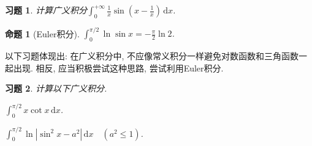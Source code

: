 \documentclass[11pt,a4paper]{ctexart}
\makeatletter
\theoremstyle{thmseries} %
\newtheorem{prop}{命题}[section]
\theoremstyle{exerseries}
\newtheorem{exer}{习题}[section]
\renewenvironment{proof}[1][\proofname]{\par
  \pushQED{\qed}%
  \normalfont \topsep6\p@\@plus6\p@\relax
  \trivlist
  \item[\hskip\labelsep
        \itshape
    #1\@addpunct{}]\ignorespaces
}{%
  \popQED\endtrivlist\@endpefalse
}
\newenvironment{sol}{\begin{proof}[\bfseries\upshape 解\quad]}{\end{proof}}
\newcommand{\bra}[1]{\mathopen{}\left(#1\right)}
\renewcommand{\d}{\mathrm{d}}
\makeatother
\begin{document}
\begin{exer}
	计算广义积分$\int_{0}^{+\infty}\frac{1}{x}\sin\bra{x-\frac{1}{x}}\,\d x$. 
\end{exer}

\begin{prop}[Euler积分]
	$\int_{0}^{\pi/2}\ln\sin x=-\frac{\pi}{2}\ln 2$. 
\end{prop}

以下习题体现出: 在广义积分中, 不应像常义积分一样避免对数函数和三角函数一起出现. 相反, 应当积极尝试这种思路, 尝试利用Euler积分. 
\begin{exer}
	计算以下广义积分. 
	\begin{enumerate}
	\end{enumerate}
\end{exer}
\end{document}
